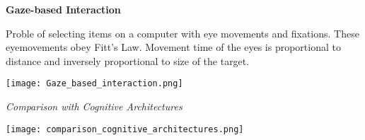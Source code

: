 \textbf{Gaze-based Interaction} \smallskip

Proble of selecting items on a computer with eye movements and fixations. These eyemovements obey Fitt's Law. 
Movement time of the eyes is proportional to distance and inversely proportional to size of the target.


\begin{center}
	\texttt{[image: Gaze\_based\_interaction.png]}
\end{center}



\textit{Comparison with Cognitive Architectures}


\begin{center}
	\texttt{[image: comparison\_cognitive\_architectures.png]}
\end{center}












